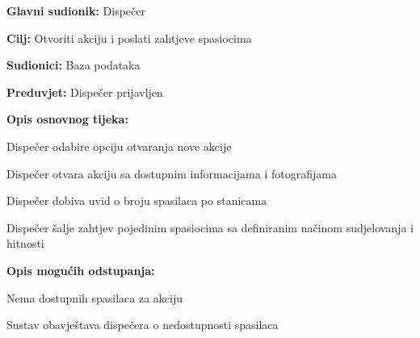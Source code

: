 					\noindent {}
					\begin{packed_item}
	
						\item \textbf{Glavni sudionik: }\text Dispečer
						\item  \textbf{Cilj:} \text Otvoriti akciju i poslati zahtjeve spasiocima
						\item  \textbf{Sudionici:} \text Baza podataka
						\item  \textbf{Preduvjet:} \text Dispečer prijavljen
						\item  \textbf{Opis osnovnog tijeka:}
						
						\item[] \begin{packed_enum}
							
							\item \text Dispečer odabire opciju otvaranja nove akcije
							\item \text Dispečer otvara akciju sa dostupnim informacijama i fotografijama
							\item \text Dispečer dobiva uvid o broju spasilaca po stanicama
							\item \text Dispečer šalje zahtjev pojedinim spasiocima sa definiranim načinom sudjelovanja i hitnosti
						\end{packed_enum}
						
						\item  \textbf{Opis mogućih odstupanja:}
						
						\item[] \begin{packed_item}
	
							\item[2.a] \text Nema dostupnih spasilaca za akciju
							\item[] \begin{packed_item}
								
								\item \text Sustav obavještava dispečera o nedostupnosti spasilaca
								
							\end{packed_item}
							
						\end{packed_item}
					\end{packed_item}

